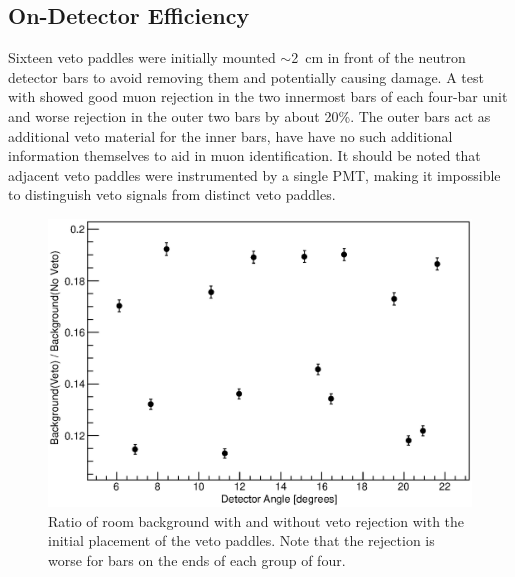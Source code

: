 \subsection{On-Detector Efficiency}

Sixteen veto paddles were initially mounted $\sim$2~cm in front of the neutron detector bars to avoid removing them and potentially causing damage.  A test with \MgReaction showed good muon rejection in the two innermost bars of each four-bar unit and worse rejection in the outer two bars by about 20\%.  The outer bars act as additional veto material for the inner bars, have have no such additional information themselves to aid in muon identification.  It should be noted that adjacent veto paddles were instrumented by a single PMT, making it impossible to distinguish veto signals from distinct veto paddles.  
\begin{figure}[!htbp]
\centering
\includegraphics[width=1.0\textwidth]{figures/bkgdRejection_old.eps}
\caption{Ratio of room background with and without veto rejection with the initial placement of the veto paddles.  Note that the rejection is worse for bars on the ends of each group of four.}
\label{fig:initialBackground}
\end{figure}

